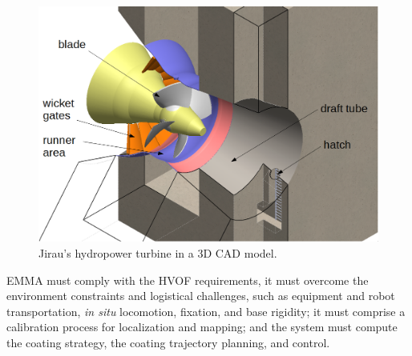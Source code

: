 \begin{figure}[h!]
\centering
	\includegraphics[width=\columnwidth]{figs/problem/ambiente_3d.PNG} 
	\caption{Jirau's hydropower turbine in a 3D CAD model.}
	\label{fig::ambiente3d}
\end{figure}

EMMA must comply with the HVOF requirements, it must overcome the environment
constraints and logistical challenges, such as equipment
and robot transportation, \textit{in situ} locomotion, fixation, and base
rigidity; it must comprise a calibration process for localization and
mapping; and the system must compute the coating strategy, the coating
trajectory planning, and control.

